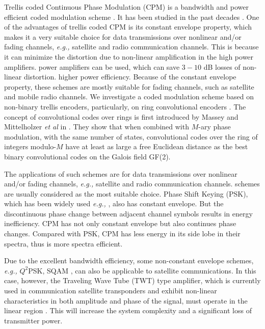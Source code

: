 \documentclass[12pt,twoside,onecolumn,a4paper,english]{IEEEtran2e}
\begin{document}
Trellis coded Continuous Phase Modulation (CPM) is a bandwidth and
power efficient coded modulation scheme \cite{anderson}. It has
been studied in the past decades
\cite{anderson,ringcodedCPMyang,ringcodedCPMrimoldi}. One of the
advantages of trellis coded CPM is its constant envelope property,
which makes it a very suitable choice for data transmissions over
nonlinear and/or fading channels, \textit{e.g.,} satellite and
radio communication channels. This is because it can minimize the
distortion due to
non-linear amplification in the high power amplifiers. %
power amplifiers can be used, which can save $3-10$ dB
losses of non-linear distortion\cite{anderson}. %
higher power efficiency.
Because of the constant envelope property, these schemes are mostly suitable for %
fading channels, such as satellite and mobile radio channels.
%
We investigate a coded modulation scheme based on non-binary
trellis encoders, particularly, on ring convolutional encoders
\cite{ringCC89,ringCC90}.
The concept of convolutional codes over
rings is first introduced by Massey and Mittelholzer \textit{et
al} in \cite{ringCC89,ringCC90}. They show that when combined with
$M$-ary phase modulation, with the same number of states,
convolutional codes over the ring of integers modulo-$M$ have at
least as large a free Euclidean distance \cite{w&j} as the best
binary convolutional codes on the Galois field GF(2).

The applications of such schemes are for
data transmissions over
nonlinear and/or fading channels, \textit{e.g.,} satellite and
radio communication channels. %
schemes are usually considered as the most suitable choice.
Phase Shift Keying (PSK), which has been widely used
\textit{e.g.,} \cite{3GPP25814}, also has constant envelope. But
the discontinuous phase change between adjacent channel symbols
results in energy inefficiency. CPM has not only constant envelope
but also continues phase changes.
Compared with PSK, CPM has less
energy in its side lobe in their spectra, thus is more spectra
efficient.

Due to the excellent bandwidth efficiency, some non-constant
envelope schemes, %
\textit{e.g.,} $Q^2$PSK, SQAM \cite{SatelliteComm}, %
 can also be applicable to
satellite communications. %
In this case, however, the Traveling Wave Tube (TWT) type
amplifier, which is currently used in communication satellite
transponders and exhibit non-linear characteristics in both
amplitude and phase of the signal, must operate in the linear
region \cite{SatelliteComm}. This will increase the system
complexity and a significant loss of transmitter power.
\end{document}
